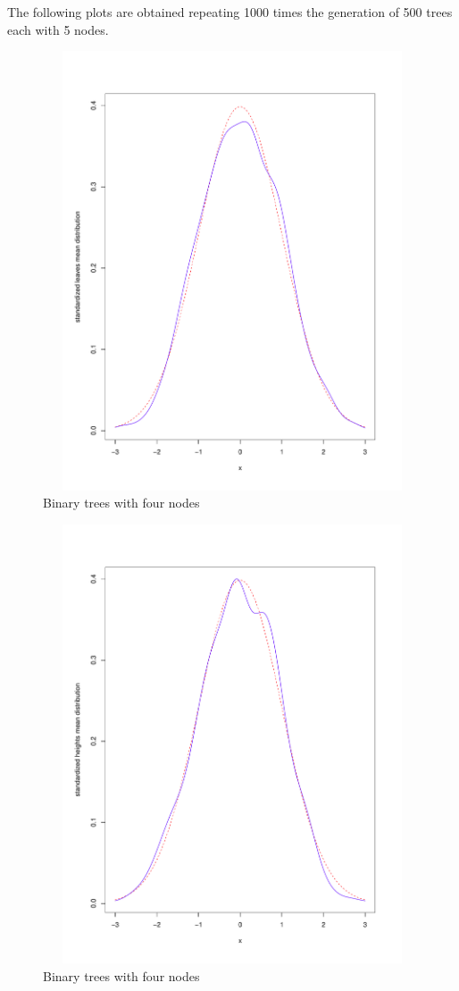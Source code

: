 The following plots are obtained repeating 1000 times the generation
of 500 trees each with 5 nodes.
\begin{figure}[htb]
  \centering
  \includegraphics[height=13cm,
  width=13cm]{pictures/repeated-sampling-leaves-mean.pdf}
  \caption{Binary trees with four nodes}
  \label{fig:binary-trees-with-four-nodes}
\end{figure}

\begin{figure}[htb]
  \centering
  \includegraphics[height=13cm,
  width=13cm]{pictures/repeated-sampling-height-mean.pdf}
  \caption{Binary trees with four nodes}
  \label{fig:binary-trees-with-four-nodes}
\end{figure}


